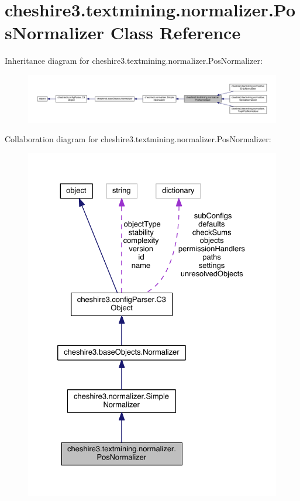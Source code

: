 \hypertarget{classcheshire3_1_1textmining_1_1normalizer_1_1_pos_normalizer}{\section{cheshire3.\-textmining.\-normalizer.\-Pos\-Normalizer Class Reference}
\label{classcheshire3_1_1textmining_1_1normalizer_1_1_pos_normalizer}
}


Inheritance diagram for cheshire3.\-textmining.\-normalizer.\-Pos\-Normalizer\-:
\nopagebreak
\begin{figure}[H]
\begin{center}
\leavevmode
\includegraphics[width=350pt]{classcheshire3_1_1textmining_1_1normalizer_1_1_pos_normalizer__inherit__graph}
\end{center}
\end{figure}


Collaboration diagram for cheshire3.\-textmining.\-normalizer.\-Pos\-Normalizer\-:
\nopagebreak
\begin{figure}[H]
\begin{center}
\leavevmode
\includegraphics[width=328pt]{classcheshire3_1_1textmining_1_1normalizer_1_1_pos_normalizer__coll__graph}
\end{center}
\end{figure}
